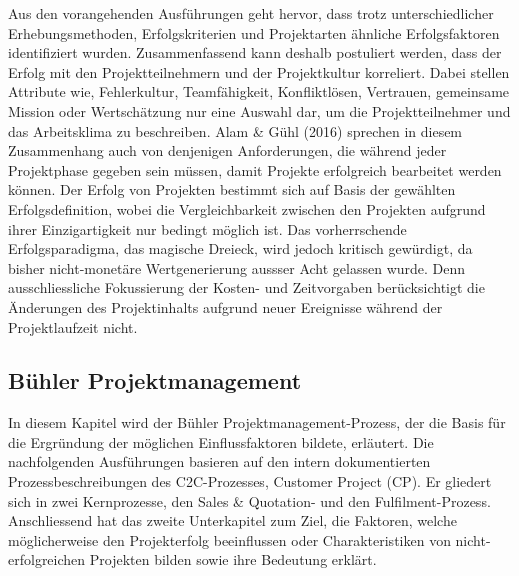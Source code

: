 \newline Aus den vorangehenden Ausführungen geht hervor, dass trotz unterschiedlicher Erhebungsmethoden, Erfolgskriterien und Projektarten ähnliche Erfolgsfaktoren identifiziert wurden. Zusammenfassend kann deshalb postuliert werden, dass der Erfolg mit den Projektteilnehmern und der Projektkultur korreliert. Dabei stellen Attribute wie, Fehlerkultur, Teamfähigkeit, Konfliktlösen, Vertrauen, gemeinsame Mission oder Wertschätzung nur eine Auswahl dar, um die Projektteilnehmer und das Arbeitsklima zu beschreiben. Alam \& Gühl (2016) sprechen in diesem Zusammenhang auch von denjenigen Anforderungen, die während jeder Projektphase gegeben sein müssen, damit Projekte erfolgreich bearbeitet werden können. Der Erfolg von Projekten bestimmt sich auf Basis der gewählten Erfolgsdefinition, wobei die Vergleichbarkeit zwischen den Projekten aufgrund ihrer Einzigartigkeit nur bedingt möglich ist. Das vorherrschende Erfolgsparadigma, das magische Dreieck, wird jedoch kritisch gewürdigt, da bisher nicht-monetäre Wertgenerierung aussser Acht gelassen wurde. Denn ausschliessliche Fokussierung der Kosten- und Zeitvorgaben berücksichtigt die Änderungen des Projektinhalts aufgrund neuer Ereignisse während der Projektlaufzeit  nicht.
\subsection{Bühler Projektmanagement}
In diesem Kapitel wird der Bühler Projektmanagement-Prozess, der die Basis für die Ergründung der möglichen Einflussfaktoren bildete, erläutert. Die nachfolgenden Ausführungen basieren auf den intern dokumentierten Prozessbeschreibungen des C2C-Prozesses, Customer Project (CP). Er gliedert sich in zwei Kernprozesse, den Sales \& Quotation- und den Fulfilment-Prozess. Anschliessend hat das zweite Unterkapitel zum Ziel, die Faktoren, welche möglicherweise den Projekterfolg beeinflussen oder Charakteristiken von nicht-erfolgreichen Projekten bilden sowie ihre Bedeutung erklärt.
